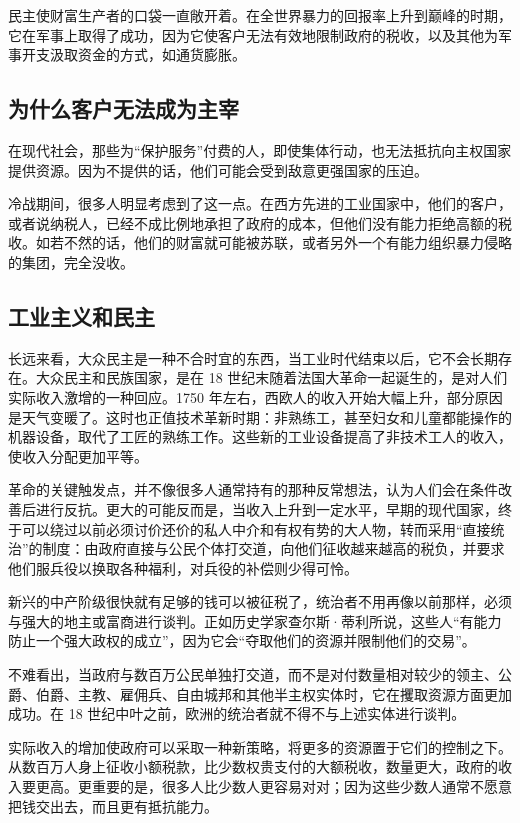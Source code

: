 民主使财富生产者的口袋一直敞开着。在全世界暴力的回报率上升到巅峰的时期，它在军事上取得了成功，因为它使客户无法有效地限制政府的税收，以及其他为军事开支汲取资金的方式，如通货膨胀。

\subsection{为什么客户无法成为主宰}
在现代社会，那些为“保护服务”付费的人，即使集体行动，也无法抵抗向主权国家提供资源。因为不提供的话，他们可能会受到敌意更强国家的压迫。

冷战期间，很多人明显考虑到了这一点。在西方先进的工业国家中，他们的客户，或者说纳税人，已经不成比例地承担了政府的成本，但他们没有能力拒绝高额的税收。如若不然的话，他们的财富就可能被苏联，或者另外一个有能力组织暴力侵略的集团，完全没收。

\subsection{工业主义和民主}
长远来看，大众民主是一种不合时宜的东西，当工业时代结束以后，它不会长期存在。大众民主和民族国家，是在 18 世纪末随着法国大革命一起诞生的，是对人们实际收入激增的一种回应。1750 年左右，西欧人的收入开始大幅上升，部分原因是天气变暖了。这时也正值技术革新时期：非熟练工，甚至妇女和儿童都能操作的机器设备，取代了工匠的熟练工作。这些新的工业设备提高了非技术工人的收入，使收入分配更加平等。

革命的关键触发点，并不像很多人通常持有的那种反常想法，认为人们会在条件改善后进行反抗。更大的可能反而是，当收入上升到一定水平，早期的现代国家，终于可以绕过以前必须讨价还价的私人中介和有权有势的大人物，转而采用“直接统治”的制度：由政府直接与公民个体打交道，向他们征收越来越高的税负，并要求他们服兵役以换取各种福利，对兵役的补偿则少得可怜。

新兴的中产阶级很快就有足够的钱可以被征税了，统治者不用再像以前那样，必须与强大的地主或富商进行谈判。正如历史学家查尔斯·蒂利所说，这些人“有能力防止一个强大政权的成立”，因为它会“夺取他们的资源并限制他们的交易”。

不难看出，当政府与数百万公民单独打交道，而不是对付数量相对较少的领主、公爵、伯爵、主教、雇佣兵、自由城邦和其他半主权实体时，它在攫取资源方面更加成功。在 18 世纪中叶之前，欧洲的统治者就不得不与上述实体进行谈判。

实际收入的增加使政府可以采取一种新策略，将更多的资源置于它们的控制之下。从数百万人身上征收小额税款，比少数权贵支付的大额税收，数量更大，政府的收入要更高。更重要的是，很多人比少数人更容易对对；因为这些少数人通常不愿意把钱交出去，而且更有抵抗能力。


